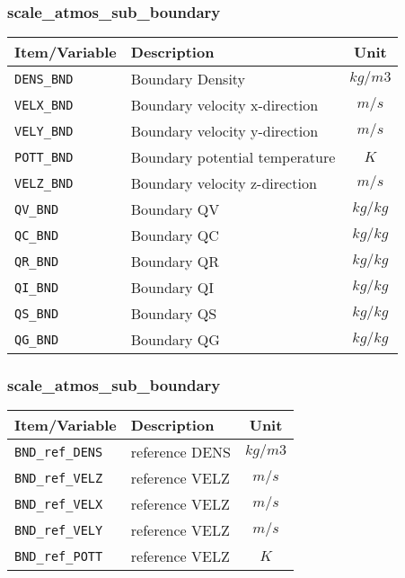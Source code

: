 \subsubsection{scale\_atmos\_sub\_boundary}
 \begin{tabularx}{150mm}{|l|X|c|} \hline
 \rowcolor[gray]{0.9} Item/Variable & Description  & Unit \\\hline
  \verb|DENS_BND| & Boundary Density               & $kg/m3$ \\\hline
  \verb|VELX_BND| & Boundary velocity x-direction  & $m/s$ \\\hline
  \verb|VELY_BND| & Boundary velocity y-direction  & $m/s$ \\\hline
  \verb|POTT_BND| & Boundary potential temperature & $K$   \\\hline
  \verb|VELZ_BND| & Boundary velocity z-direction  & $m/s$ \\\hline
  \verb|QV_BND|   & Boundary QV                    & $kg/kg$ \\\hline
  \verb|QC_BND|   & Boundary QC                    & $kg/kg$ \\\hline
  \verb|QR_BND|   & Boundary QR                    & $kg/kg$ \\\hline
  \verb|QI_BND|   & Boundary QI                    & $kg/kg$ \\\hline
  \verb|QS_BND|   & Boundary QS                    & $kg/kg$ \\\hline
  \verb|QG_BND|   & Boundary QG                    & $kg/kg$ \\\hline
 \end{tabularx}

\subsubsection{scale\_atmos\_sub\_boundary}
 \begin{tabularx}{150mm}{|l|X|c|} \hline
 \rowcolor[gray]{0.9} Item/Variable & Description  & Unit \\\hline
  \verb|BND_ref_DENS| & reference DENS    & $kg/m3$ \\\hline
  \verb|BND_ref_VELZ| & reference VELZ    & $m/s$   \\\hline
  \verb|BND_ref_VELX| & reference VELZ    & $m/s$   \\\hline
  \verb|BND_ref_VELY| & reference VELZ    & $m/s$   \\\hline
  \verb|BND_ref_POTT| & reference VELZ    & $K$      \\\hline
 \end{tabularx}
